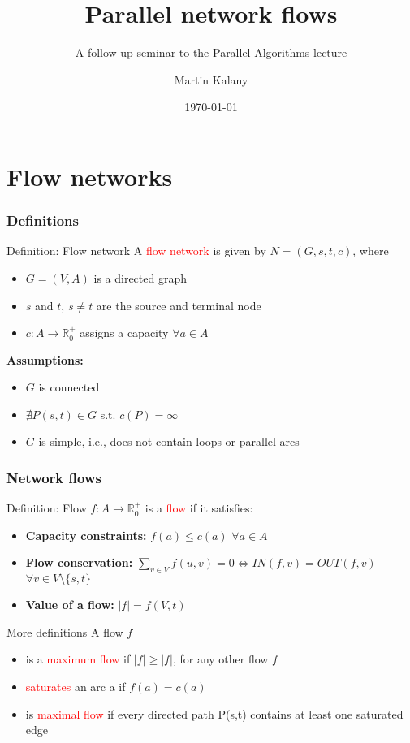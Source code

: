 \documentclass{beamer}
\title{Parallel network flows}
\subtitle{A follow up seminar to the Parallel Algorithms lecture}
\author{Martin Kalany\inst{1} }
\institute
{
  \inst{1}
  Graduate student in Computer Science\\
  Vienna University of Technology\\
}
\date{\today}
\begin{document}

	\frame{\titlepage}
	
	\section{Flow networks}
 	\begin{frame}
	\frametitle{Definitions}
    \begin{block}{Definition: Flow network}
    A \textcolor{red}{flow network}\cite{Ahuja93} is given by $N = (G,s,t,c)$, where
    \begin{itemize}
    		\item $G =(V,A)$ is a directed graph
    		\item $s$ and $t$, $s \neq t$ are the source and terminal node
    		\item $c:A\rightarrow \mathbb{R}_0^{+}$ assigns a capacity $\forall a \in A$
    \end{itemize}
    \end{block}
    \textbf{Assumptions:}
	\begin{itemize}
		\item $G$ is connected
		\item $\nexists P(s,t) \in G$ s.t. $c(P) = \infty$
		\item $G$ is simple, i.e., does not contain loops or parallel arcs
	\end{itemize}
	\end{frame}
  
	\begin{frame}[shrink]
	\frametitle{Network flows}
	\begin{block}{Definition: Flow}
	$f:A \rightarrow \mathbb{R}_0^{+}$ is a \textcolor{red}{flow} if it satisfies:
	\begin{itemize}
		\item \textbf{Capacity constraints:} $f(a) \leq c(a)$ $\forall a \in A$
		\item \textbf{Flow conservation:} 
		$ \sum\limits_{v \in V} f(u,v) =  0 \Leftrightarrow IN(f,v) = OUT(f,v)$ $\forall v \in V \setminus \{s,t\}$
		\item \textbf{Value of a flow:} $\lvert f\rvert = f(V,t)$ 
	\end{itemize}
	\end{block}
	
	\begin{block}{More definitions }
	A flow $f$	
	\begin{itemize}
		\item is a \textcolor{red}{maximum flow} if $\lvert f\rvert \geq \lvert f\rvert$, for any other flow $f$
		\item \textcolor{red}{saturates} an arc a if $f(a) = c(a)$
		\item is \textcolor{red}{maximal flow} if every directed path P(s,t) contains at least one saturated edge
	\end{itemize}
	
	\end{block}
	\end{frame}
	
\end{document}
